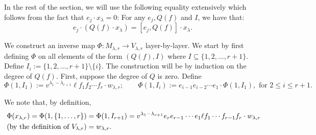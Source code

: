 \documentclass{amsart}
\numberwithin{equation}{section}
\theoremstyle{theorem}
\theoremstyle{definition}
\newcommand{\sub}{\subseteq}
\newcommand{\sm}{\setminus}
\begin{document}
In the rest of the section, we will use the following equality extensively which follows from the fact that $e_j\cdot x_{\lambda}=0$: For any $e_j, Q(f)$ and $I$, we have that:
\[e_j\cdot (Q(f)\cdot x_{\lambda}) = [e_j, Q(f)]\cdot x_{\lambda}.\]

We construct an inverse map $\Phi:M_{\lambda,r}\to V_{\lambda,r}$ layer-by-layer. We start by first defining $\Phi$ on all elements of the form $(Q(f),I)$ where $I\sub \{1,2,\dots,r+1\}$. Define $I_i:=\{1,2,\dots, r+1\}\sm\{i\}$. The construction will be by induction on the degree of $Q(f)$. First, suppose the degree of $Q$ is zero. Define 
\begin{equation}\label{eq:Phi1}\Phi(1,I_1) := v^{\lambda_1-\lambda_{r+1}}\ell f_1f_2\cdots f_r \cdot  w_{\lambda,r};\qquad
\Phi(1,I_i):=e_{i-1}e_{i-2}\cdots e_1\cdot \Phi(1,I_1), \text{ for }2\leq i\leq r+1.\end{equation}%

We note that, by definition, 
\begin{align}\notag\Phi(x_{\lambda,r})=\Phi(1,\{1,\ldots,r\})& =\Phi(1,I_{r+1})=v^{\lambda_1-\lambda_{r+1}}e_re_{r-1}\cdots e_1\ell f_1\cdots f_{r-1}f_r\cdot w_{\lambda, r}\\
\label{eq:topvect}\text{ (by the definition of $V_{\lambda,r}$)} & = w_{\lambda,r}.
\end{align}
\end{document}
